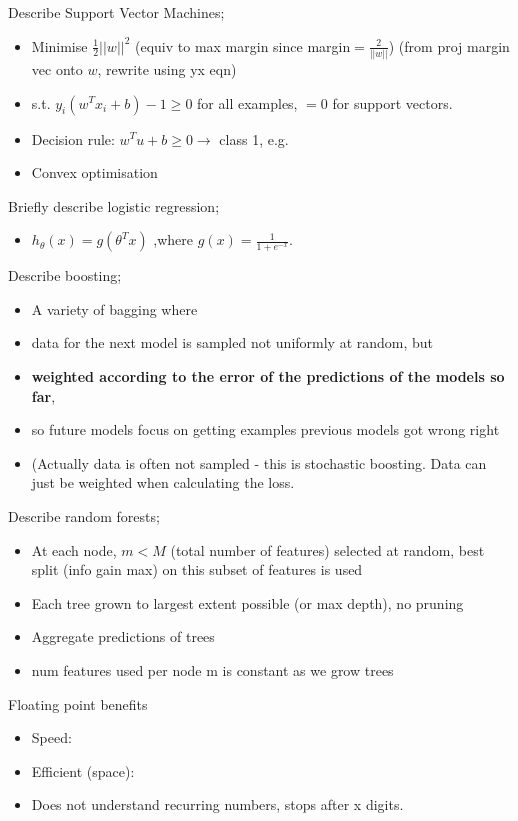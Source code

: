 \documentclass{article}
\begin{document}
Describe Support Vector Machines; \begin{itemize} \item Minimise $\frac{1}{2}||w||^2$ (equiv to max margin since margin$=\frac{2}{||w||}$) (from proj margin vec onto $w$, rewrite using yx eqn) \item s.t. $y_i(w^Tx_i+b)-1\geq 0$ for all examples, $=0$ for support vectors.  \item Decision rule: $w^Tu+b\geq 0\rightarrow$ class 1, e.g.  \item Convex optimisation \end{itemize}

Briefly describe logistic regression; \begin{itemize} \item $h_{\theta}(x) = g(\theta^Tx)$ ,where $g(x)=\frac{1}{1+e^{-x}}$.  \end{itemize}

Describe boosting; \begin{itemize} \item A variety of bagging where \item data for the next model is sampled not uniformly at random, but \item \textbf{weighted according to the error of the predictions of the models so far}, \item so future models focus on getting examples previous models got wrong right
\item (Actually data is often not sampled - this is stochastic boosting. Data can just be weighted when calculating the loss. \end{itemize}

Describe random forests; \begin{itemize} \item At each node, $m<M$ (total number of features) selected at random, best split (info gain max) on this subset of features is used \item Each tree grown to largest extent possible (or max depth), no pruning \item Aggregate predictions of trees \item num features used per node m is constant as we grow trees \end{itemize}

Floating point benefits \begin{itemize} \item Speed: \item Efficient (space): \item Does not understand recurring numbers, stops after x digits.  \end{itemize}
\end{document}
